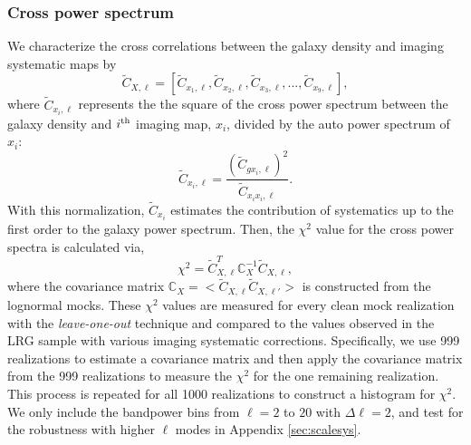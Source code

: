 \subsubsection{Cross power spectrum}

We characterize the cross correlations between the galaxy density and imaging systematic maps by
\begin{equation}
\tilde{C}_{X, \ell} = [\tilde{C}_{x_{1}, \ell}, \tilde{C}_{x_{2}, \ell}, \tilde{C}_{x_{3}, \ell}, ..., \tilde{C}_{x_{9}, \ell}],
\end{equation}
where $\tilde{C}_{x_{i}, \ell}$ represents the the square of the cross power spectrum between the galaxy density and $i^{\rm th}$ imaging map, $x_{i}$, divided by the auto power spectrum of $x_{i}$:
\begin{equation}
\tilde{C}_{x_{i}, \ell} = \frac{(\tilde{C}_{gx_{i}, \ell})^{2}}{\tilde{C}_{x_{i}x_{i},\ell}}.
\end{equation}
With this normalization, $\tilde{C}_{x_{i}}$ estimates the contribution of systematics up to the first order to the galaxy power spectrum. Then, the $\chi^{2}$ value for the cross power spectra is calculated via,
\begin{equation}
\chi^{2} = \tilde{C}^{T}_{X, \ell} \mathbb{C}_{X}^{-1} \tilde{C}_{X, \ell},
\end{equation}
where the covariance matrix $\mathbb{C}_{X} = < \tilde{C}_{X, \ell} \tilde{C}_{X, \ell'} >$ is constructed from the lognormal mocks. These $\chi^{2}$ values are measured for every clean mock realization with the \textit{leave-one-out} technique and compared to the values observed in the LRG sample with various imaging systematic corrections. Specifically, we use 999 realizations to estimate a covariance matrix and then apply the covariance matrix from the 999 realizations to measure the $\chi^{2}$ for the one remaining realization. This process is repeated for all 1000 realizations to construct a histogram for $\chi^{2}$. We only include the bandpower bins from $\ell=2$ to $20$ with $\Delta\ell=2$, and test for the robustness with higher $\ell$ modes in Appendix \ref{sec:scalesys}. 

